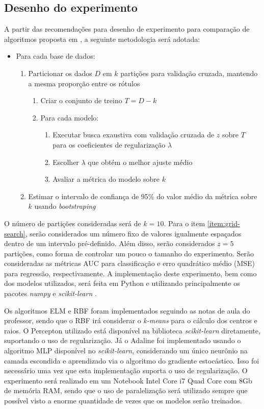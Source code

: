 \documentclass[conference]{IEEEtran}
\begin{document}
	\subsection{Desenho do experimento}
	A partir das recomendações para desenho de experimento para comparação de algoritmos proposta em \cite{salzberg1997comparing}, a seguinte metodologia será adotada:
	\begin{itemize}
		\item Para cada base de dados:
			\begin{enumerate}
			\item Particionar os dados $D$ em $k$ partições para validação cruzada, mantendo a mesma proporção entre os rótulos
			\begin{enumerate}
				\item Criar o conjunto de treino $T = D - k$
				\item Para cada modelo:
				\begin{enumerate}
					\item Executar busca exaustiva com validação cruzada de $z$ sobre $T$ para os coeficientes de regularização $\lambda$ \label{item:grid-search}
					\item Escolher $\lambda$ que obtém o melhor ajuste médio 
					\item Avaliar a métrica do modelo sobre $k$
				\end{enumerate}
			\end{enumerate}
			\item Estimar o intervalo de confiança de 95\% do valor médio da métrica sobre $k$ usando \textit{bootstraping}
		\end{enumerate}
	\end{itemize}
	
	O número de partições consideradas será de $k=10$. Para o item \ref{item:grid-search}, serão considerados um número fixo de valores igualmente espaçados dentro de um intervalo pré-definido. Além disso, serão considerados $z=5$ partições, como forma de controlar um pouco o tamanho do experimento. Serão consideradas as métricas AUC para classificação e erro quadrático médio (MSE) para regressão, respectivamente. A implementação deste experimento, bem como dos modelos utilizados, será feita em Python e utilizando principalmente os pacotes \textit{numpy} \cite{harris2020array} e \textit{scikit-learn} \cite{scikit-learn}. 
	
	Os algoritmos ELM e RBF foram implementados seguindo as notas de aula do professor, sendo que o RBF irá considerar o \textit{k-means} para o cálculo dos centros e raios. O Percepton utilizado está disponível na biblioteca \textit{scikit-learn} diretamente, suportando o uso de regularização. Já o Adaline foi implementado usando o algoritmo MLP disponível no \textit{scikit-learn}, considerando um único neurônio na camada escondida e aprendizado via o algoritmo do gradiente estocástico. Isso foi necessário uma vez que esta implementação suporta o uso de regularização. O experimento será realizado em um Notebook Intel Core i7 Quad Core com 8Gb de memória RAM, sendo que o uso de paralelização será utilizado sempre que possível visto a enorme quantidade de vezes que os modelos serão treinados.
	
\end{document}
